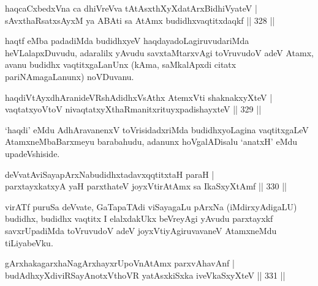 
\begin{shl}
haqcaCxbedxVna ca dhiVreVva tAtAsxthXyXdatArxBidhiVyateV | \\
sAvxthaRsatxsAyxM ya ABAti sa AtAmx budidhxvaqtitxdaqkf \hfill||  328 ||  
\end{shl}

\begin{artha}
haqtf eMba padadiMda budidhxyeV haqdayadoLagiruvudariMda heVLalapxDuvudu, adaralilx yAvudu savxtaMtarxvAgi toVruvudoV adeV Atamx, avanu budidhx vaqtitxgaLanUnx (kAma, saMkalApxdi citatx pariNAmagaLanunx) noVDuvanu.
\end{artha}


\begin{shl}
haqdiVtAyxdhAranideVRshAdidhxVsAthx AtemxVti shaknakxyXteV | \\
vaqtatxyoV\s toV nivaqtatxyXthaRmanitxrituyxpadishayxteV \hfill||  329 || 
\end{shl}

\begin{artha}
`haqdi' eMdu AdhAravanenxV toVrisidadxriMda budidhxyoLagina vaqtitxgaLeV AtamxneMbaBarxmeyu barabahudu, adanunx hoVgalADisalu `anatxH' eMdu upadeVshiside.
\end{artha}


\begin{shl}
deVvatAviSayapArxNabudidhxtadavxqqtitxtaH paraH | \\
parxtayxkatxyA yaH parxthateV joyxVtirAtAmx sa IkaSxyXtAmf \hfill||  330 ||  
\end{shl}

\begin{artha}
virATf puruSa deVvate, GaTapaTAdi viSayagaLu pArxNa (iMdirxyAdigaLU) budidhx, budidhx vaqtitx I elalxdakUkx beVreyAgi yAvudu parxtayxkf savxrUpadiMda toVruvudoV adeV joyxVtiyAgiruvavaneV AtamxneMdu tiLiyabeVku.
\end{artha}


\begin{shl}
gArxhakagarxhaNagArxhayxrUpoV\s nAtAmx parxvAhavAnf | \\
budAdhxyXdiviRSayAnotxV\s thoVR yatAsxkiSxka iveVkaSxyXteV \hfill||  331 ||  
\end{shl}

